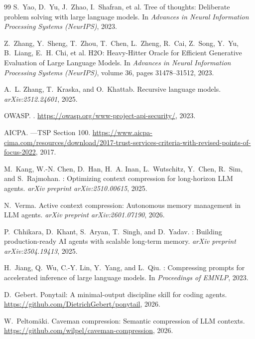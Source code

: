 \documentclass[conference]{IEEEtran}
\begin{document}
\begin{thebibliography}{99}
S.~Yao, D.~Yu, J.~Zhao, I.~Shafran, et al.
\newblock Tree of thoughts: Deliberate problem solving with large language models.
\newblock In \emph{Advances in Neural Information Processing Systems (NeurIPS)}, 2023.

Z.~Zhang, Y.~Sheng, T.~Zhou, T.~Chen, L.~Zheng, R.~Cai, Z.~Song, Y.~Yu, B.~Liang, E.~H. Chi, et al.
\newblock H2O: Heavy-Hitter Oracle for Efficient Generative Evaluation of Large Language Models.
\newblock In \emph{Advances in Neural Information Processing Systems (NeurIPS)}, volume 36, pages 31478--31512, 2023.

A.~L. Zhang, T.~Kraska, and O.~Khattab.
\newblock Recursive language models.
\newblock \emph{arXiv:2512.24601}, 2025.

OWASP.
.
\newblock \url{https://owasp.org/www-project-api-security/}, 2023.

AICPA.
---TSP Section 100.
\newblock \url{https://www.aicpa-cima.com/resources/download/2017-trust-services-criteria-with-revised-points-of-focus-2022}, 2017.

M.~Kang, W.-N. Chen, D.~Han, H.~A. Inan, L.~Wutschitz, Y.~Chen, R.~Sim, and S.~Rajmohan.
: Optimizing context compression for long-horizon {LLM} agents.
\newblock \emph{arXiv preprint arXiv:2510.00615}, 2025.

N.~Verma.
\newblock Active context compression: Autonomous memory management in {LLM} agents.
\newblock \emph{arXiv preprint arXiv:2601.07190}, 2026.

P.~Chhikara, D.~Khant, S.~Aryan, T.~Singh, and D.~Yadav.
: Building production-ready {AI} agents with scalable long-term memory.
\newblock \emph{arXiv preprint arXiv:2504.19413}, 2025.

H.~Jiang, Q.~Wu, C.-Y. Lin, Y.~Yang, and L.~Qiu.
: Compressing prompts for accelerated inference of large language models.
\newblock In \emph{Proceedings of EMNLP}, 2023.

D.~Gebert.
\newblock Ponytail: A minimal-output discipline skill for coding agents.
\newblock \url{https://github.com/DietrichGebert/ponytail}, 2026.

W.~Peltom\"aki.
\newblock Caveman compression: Semantic compression of {LLM} contexts.
\newblock \url{https://github.com/wilpel/caveman-compression}, 2026.

\end{thebibliography}
\end{document}
